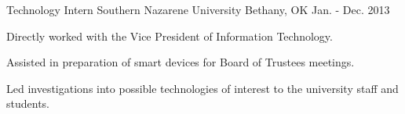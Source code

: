 \begin{cventries}
\cventry
{Technology Intern} %
{Southern Nazarene University} %
{Bethany, OK} %
{Jan. - Dec. 2013} %
{
	\begin{cvitems} %
		\item {Directly worked with the Vice President of Information Technology.}
		\item{Assisted in preparation of smart devices for Board of Trustees meetings.}
		\item{Led investigations into possible technologies of interest to the university staff and students.}
	\end{cvitems}
}





\end{cventries}
